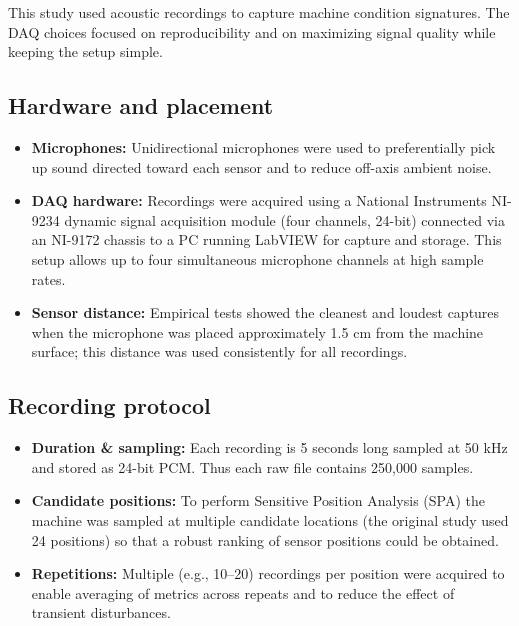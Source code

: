 \documentclass[12pt,a4paper]{article}
\begin{document}
This study used acoustic recordings to capture machine condition signatures. The DAQ choices focused on reproducibility and on maximizing signal quality while keeping the setup simple.

\subsection{Hardware and placement}
\begin{itemize}
  \item \textbf{Microphones:} Unidirectional microphones were used to preferentially pick up sound directed toward each sensor and to reduce off-axis ambient noise.
  \item \textbf{DAQ hardware:} Recordings were acquired using a National Instruments NI-9234 dynamic signal acquisition module (four channels, 24-bit) connected via an NI-9172 chassis to a PC running LabVIEW for capture and storage. This setup allows up to four simultaneous microphone channels at high sample rates.
  \item \textbf{Sensor distance:} Empirical tests showed the cleanest and loudest captures when the microphone was placed approximately 1.5 cm from the machine surface; this distance was used consistently for all recordings.
\end{itemize}

\subsection{Recording protocol}
\begin{itemize}
  \item \textbf{Duration \& sampling:} Each recording is 5 seconds long sampled at 50 kHz and stored as 24-bit PCM. Thus each raw file contains 250,000 samples.
  \item \textbf{Candidate positions:} To perform Sensitive Position Analysis (SPA) the machine was sampled at multiple candidate locations (the original study used 24 positions) so that a robust ranking of sensor positions could be obtained.
  \item \textbf{Repetitions:} Multiple (e.g., 10--20) recordings per position were acquired to enable averaging of metrics across repeats and to reduce the effect of transient disturbances.
\end{itemize}
\end{document}
